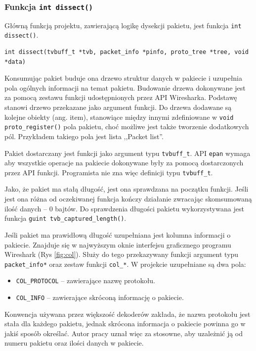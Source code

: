 \documentclass[a4paper, 12pt, twoside, openright]{article}
\begin{document}
	\subsubsection{Funkcja \texttt{int dissect()}}
	\indent\par
	Główną funkcją projektu, zawierającą logikę dysekcji pakietu, jest funkcja \texttt{int dissect()}.
	\begin{lstlisting}[style=CStyleLine]
	int dissect(tvbuff_t *tvb, packet_info *pinfo, proto_tree *tree, void *data)
	\end{lstlisting}
	Konsumując pakiet buduje ona drzewo struktur danych w pakiecie i uzupełnia pola ogólnych informacji na temat pakietu. Budowanie
	drzewa dokonywane jest za pomocą zestawu funkcji udostępnionych przez API Wiresharka. Podstawę stanowi drzewo przekazane jako
	argument funkcji. Do drzewa dodawane są kolejne obiekty (ang. item), stanowiące między innymi zdefiniowane w \texttt{void proto\_register()}
	pola pakietu, choć możliwe jest także tworzenie dodatkowych pól. Przykładem takiego pola jest lista ,,Packet list''.

	Pakiet dostarczany jest funkcji jako argument typu \texttt{tvbuff\_t}. API \texttt{epan} wymaga aby wszystkie operacje
	na pakiecie dokonywane były za pomocą dostarczonych przez API funkcji. Programista nie zna więc definicji typu \texttt{tvbuff\_t}.

	Jako, że pakiet ma stałą długość, jest ona sprawdzana na początku funkcji. Jeśli jest ona różna od oczekiwanej funkcja
	kończy działanie zwracając skomsumowaną ilość danych -- 0 bajtów. Do sprawdzenia długości pakietu wykorzystywana jest funkcja
	\texttt{guint tvb\_captured\_length()}.

	Jeśli pakiet ma prawidłową długość uzupełniana jest kolumna informacji o pakiecie. Znajduje się w najwyższym oknie interfejsu
	graficznego programu Wireshark (Rys \ref{fig:col}). Służy do tego przekazywany funkcji argument
	typu \texttt{packet\_info*} oraz zestaw funkcji \texttt{col\_*}. W projekcie uzupełniane są dwa pola:
	\begin{itemize}
		\item \texttt{COL\_PROTOCOL} -- zawierające nazwę protokołu.
		\item \texttt{COL\_INFO} -- zawierające skróconą informację o pakiecie.
	\end{itemize}
	Konwencja używana przez większość dekoderów zakłada, że nazwa protokołu jest stała dla każdego pakietu, jednak skrócona
	informacja o pakiecie powinna go w jakiś sposób określać. Autor pracy uznał więc za stosowne, aby uzależnić ją
	od numeru pakietu oraz ilości danych w pakiecie.
\end{document}
